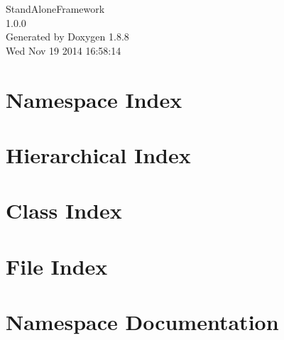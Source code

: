 \documentclass[twoside]{book}
\newcommand{\+}{\discretionary{\mbox{\scriptsize$\hookleftarrow$}}{}{}}
\newcommand{\clearemptydoublepage}{%
  \newpage{\pagestyle{empty}\cleardoublepage}%
}
\begin{document}
\hypersetup{pageanchor=false,
             bookmarks=true,
             bookmarksnumbered=true,
             pdfencoding=unicode
            }
\begin{titlepage}
\vspace*{7cm}
\begin{center}%
{\Large Stand\+Alone\+Framework \\[1ex]\large 1.\+0.\+0 }\\
\vspace*{1cm}
{\large Generated by Doxygen 1.8.8}\\
\vspace*{0.5cm}
{\small Wed Nov 19 2014 16:58:14}\\
\end{center}
\end{titlepage}
\clearemptydoublepage
\tableofcontents
\clearemptydoublepage
{}
\hypersetup{pageanchor=true}

\chapter{Namespace Index}

\chapter{Hierarchical Index}

\chapter{Class Index}

\chapter{File Index}

\chapter{Namespace Documentation}














\end{document}

